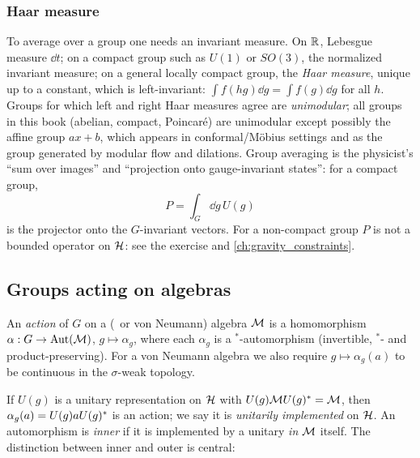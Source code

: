 \subsubsection*{Haar measure}
To average over a group one needs an invariant measure. On $\mathbb{R}$, Lebesgue measure $\dd t$; on a compact group such as $U(1)$ or $SO(3)$, the normalized invariant measure; on a general locally compact group, the \emph{Haar measure}, unique up to a constant, which is left-invariant: $\int f(hg)\dd g=\int f(g)\dd g$ for all $h$. Groups for which left and right Haar measures agree are \emph{unimodular}; all groups in this book (abelian, compact, Poincar\'e) are unimodular except possibly the affine group $ax+b$, which appears in conformal/Möbius settings and as the group generated by modular flow and dilations. Group averaging is the physicist's ``sum over images'' and ``projection onto gauge-invariant states'': for a compact group,
\begin{equation}
P=\int_G\dd g\,U(g)
\end{equation}
is the projector onto the $G$-invariant vectors. For a non-compact group $P$ is not a bounded operator on $\mathcal{H}$: see the exercise and \cref{ch:gravity_constraints}.

\subsection{Groups acting on algebras}

\begin{definition}
An \emph{action} of $G$ on a (\cstar\ or von Neumann) algebra $\mathcal{M}$ is a homomorphism $\alpha:G\to\operatorname{Aut}(\mathcal{M})$, $g\mapsto\alpha_g$, where each $\alpha_g$ is a $^*$-automorphism (invertible, $^*$- and product-preserving). For a von Neumann algebra we also require $g\mapsto\alpha_g(a)$ to be continuous in the $\sigma$-weak topology.
\end{definition}

If $U(g)$ is a unitary representation on $\mathcal{H}$ with $U(g)\mathcal{M} U(g)^{*}=\mathcal{M}$, then $\alpha_g(a)=U(g)aU(g)^{*}$ is an action; we say it is \emph{unitarily implemented} on $\mathcal{H}$. An automorphism is \emph{inner} if it is implemented by a unitary \emph{in} $\mathcal{M}$ itself. The distinction between inner and outer is central:

